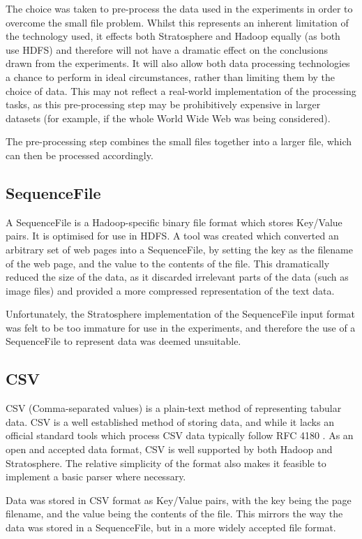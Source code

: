 The choice was taken to pre-process the data used in the experiments in order to overcome the small file problem. Whilst this represents an inherent limitation of the technology used, it effects both Stratosphere and Hadoop equally (as both use HDFS) and therefore will not have a dramatic effect on the conclusions drawn from the experiments. It will also allow both data processing technologies a chance to perform in ideal circumstances, rather than limiting them by the choice of data. This may not reflect a real-world implementation of the processing tasks, as this pre-processing step may be prohibitively expensive in larger datasets (for example, if the whole World Wide Web was being considered).

The pre-processing step combines the small files together into a larger file, which can then be processed accordingly.

\subsection{SequenceFile}
A SequenceFile is a Hadoop-specific binary file format which stores Key/Value pairs. It is optimised for use in HDFS. A tool was created which converted an arbitrary set of web pages into a SequenceFile, by setting the key as the filename of the web page, and the value to the contents of the file. This dramatically reduced the size of the data, as it discarded irrelevant parts of the data (such as image files) and provided a more compressed representation of the text data. 

Unfortunately, the Stratosphere implementation of the SequenceFile input format was felt to be too immature for use in the experiments, and therefore the use of a SequenceFile to represent data was deemed unsuitable.

\subsection{CSV}
CSV (Comma-separated values) is a plain-text method of representing tabular data. CSV is a well established method of storing data, and while it lacks an official standard tools which process CSV data typically follow RFC 4180 \cite{rfc4180}. As an open and accepted data format, CSV is well supported by both Hadoop and Stratosphere. The relative simplicity of the format also makes it feasible to implement a basic parser where necessary. 

Data was stored in CSV format as Key/Value pairs, with the key being the page filename, and the value being the contents of the file. This mirrors the way the data was stored in a SequenceFile, but in a more widely accepted file format. 

